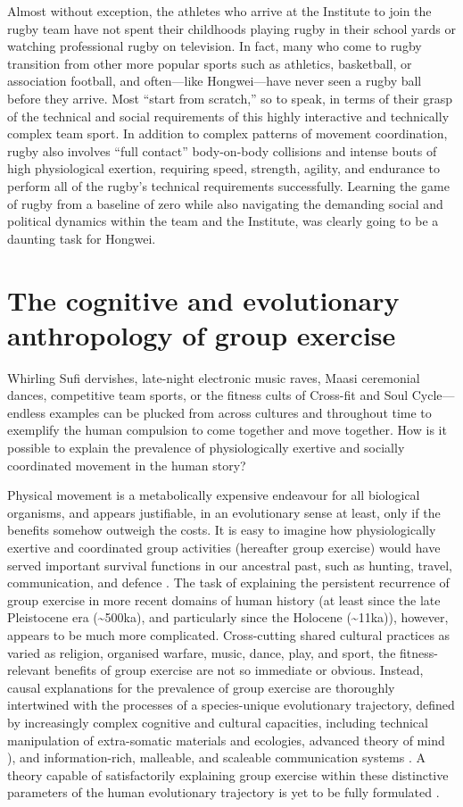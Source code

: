 Almost without exception, the athletes who arrive at the Institute to join the rugby team have not spent their childhoods playing rugby in their school yards or watching professional rugby on television.  In fact, many who come to rugby transition from other more popular sports such as athletics, basketball, or association football, and often---like Hongwei---have never seen a rugby ball before they arrive.  Most ``start from scratch,'' so to speak, in terms of their grasp of the technical and social requirements of this highly interactive and technically complex team sport. In addition to complex patterns of movement coordination, rugby also involves ``full contact'' body-on-body collisions and intense bouts of high physiological exertion, requiring speed, strength, agility, and endurance to perform all of the rugby's technical requirements successfully.  Learning the game of rugby from a baseline of zero while also navigating the demanding social and political dynamics within the team and the Institute, was clearly going to be a daunting task for Hongwei.


\section{The cognitive and evolutionary anthropology of group exercise}
Whirling Sufi dervishes, late-night electronic music raves, Maasi ceremonial dances, competitive team sports, or the fitness cults of Cross-fit and Soul Cycle---endless examples can be plucked from across cultures and throughout time to exemplify the human compulsion to come together and move together.  How is it possible to explain the prevalence of physiologically exertive and socially coordinated movement in the human story?

Physical movement is a metabolically expensive endeavour for all biological organisms,  and appears justifiable, in an evolutionary sense at least, only if the benefits somehow outweigh the costs.  It is easy to imagine how physiologically exertive and coordinated group activities (hereafter group exercise) would have served important survival functions in our ancestral past, such as hunting, travel, communication, and defence \citep{Sands2010}.  The task of explaining the persistent recurrence of group exercise in more recent domains of human history (at least since the late Pleistocene era (\sim500ka), and particularly since the Holocene (\sim11ka)), however, appears to be much more complicated.  Cross-cutting shared cultural practices as varied as religion, organised warfare, music, dance, play, and sport, the fitness-relevant benefits of group exercise are not so immediate or obvious.  Instead, causal explanations for the prevalence of group exercise are thoroughly intertwined with the processes of a species-unique evolutionary trajectory, defined by increasingly complex cognitive and cultural capacities, including technical manipulation of extra-somatic materials and ecologies, advanced theory of mind \citep{Tomasello1999}), and information-rich, malleable, and scaleable communication systems \citep{Fuentes2016}.  A theory capable of satisfactorily explaining group exercise within these distinctive parameters of the human evolutionary trajectory is yet to be fully formulated \citep{Cohen2017}.

